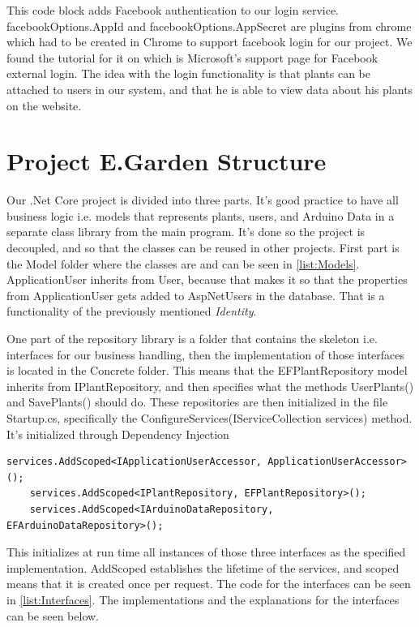 \documentclass[a4paper,12pt,oneside,openright,titlepage]{book}
\begin{document}
This code block adds Facebook authentication to our login service. facebookOptions.AppId and facebookOptions.AppSecret are plugins from chrome which had to be created in Chrome to support facebook login for our project. We found the tutorial for it on \cite{FacebookLogin} which is Microsoft's support page for Facebook external login. The idea with the login functionality is that plants can be attached to users in our system, and that he is able to view data about his plants on the website.

\section{Project E.Garden Structure}
Our .Net Core project is divided into three parts. It's good practice to have all business logic i.e. models that represents plants, users, and Arduino Data in a separate class library from the main program. It's done so the project is decoupled, and so that the classes can be reused in other projects. First part is the Model folder where the classes are and can be seen in \ref{list:Models}. ApplicationUser inherits from User, because that makes it so that the properties from ApplicationUser gets added to AspNetUsers in the database. That is a functionality of the previously mentioned \emph{Identity}. 


One part of the repository library is a folder that contains the skeleton i.e. interfaces for our business handling, then the implementation of those interfaces is located in the Concrete folder. This means that the EFPlantRepository model inherits from IPlantRepository, and then specifies what the methods UserPlants() and SavePlants() should do. These repositories are then initialized in the file Startup.cs, specifically the ConfigureServices(IServiceCollection services) method. It's initialized through Dependency Injection\cite{DependencyInjection}


\label{list:DpInjection}
\begin{lstlisting}[caption={Dependency Injection}, language=CSharp]
	services.AddScoped<IApplicationUserAccessor, ApplicationUserAccessor>();
	services.AddScoped<IPlantRepository, EFPlantRepository>();
    services.AddScoped<IArduinoDataRepository, EFArduinoDataRepository>();
\end{lstlisting}

This initializes at run time all instances of those three interfaces as the specified implementation. AddScoped establishes the lifetime of the services, and scoped means that it is created once per request. The code for the interfaces can be seen in \ref{list:Interfaces}. The implementations and the explanations for the interfaces can be seen below.
\end{document}
